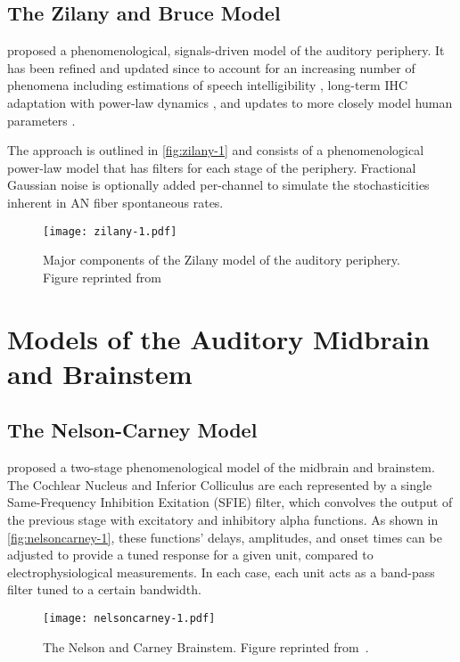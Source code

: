 \subsection{The Zilany and Bruce Model} %
\label{sub:the_zilany_and_bruce_model}
\cite{Zilany2006Modeling} proposed a phenomenological, signals-driven model of the auditory periphery.  It has been refined and updated since to account for an increasing number of phenomena including estimations of speech intelligibility \citep{Zilany2007Predictions}, long-term IHC adaptation with power-law dynamics \citep{Zilany2009Phenomenological}, and updates to more closely model human parameters \citep{Zilany2014Updated}.  

The approach is outlined in \autoref{fig:zilany-1} and consists of a phenomenological power-law model that has filters for each stage of the periphery.  Fractional Gaussian noise is optionally added per-channel to simulate the stochasticities inherent in AN fiber spontaneous rates. 

\begin{figure}[htbp]
	\centering
	\texttt{[image: zilany-1.pdf]}
	\caption[The Zilany Model]{Major components of the Zilany model of the auditory periphery.  Figure reprinted from~\cite{Zilany2009Phenomenological}}
	\label{fig:zilany-1}
\end{figure}
\section{Models of the Auditory Midbrain and Brainstem} %
\label{sec:models_of_the_auditory_midbrain_and_brainstem}
\subsection{The Nelson-Carney Model} %
\label{sub:the_nelson_carney_model}
\cite{Nelson2004Phenomenological} proposed a two-stage phenomenological model of the midbrain and brainstem.  The Cochlear Nucleus and Inferior Colliculus are each represented by a single Same-Frequency Inhibition Exitation (SFIE) filter, which convolves the output of the previous stage with  excitatory and inhibitory alpha functions.  As shown in \autoref{fig:nelsoncarney-1}, these functions' delays, amplitudes, and onset times can be adjusted to provide a tuned response for a given unit, compared to electrophysiological measurements.  In each case, each unit acts as a band-pass filter tuned to a certain bandwidth. 
\begin{figure}[htbp]
	\centering
	\texttt{[image: nelsoncarney-1.pdf]}
	\caption{The Nelson and Carney Brainstem. Figure reprinted from~\cite{Nelson2004Phenomenological}.}
	\label{fig:nelsoncarney-1}
\end{figure}

